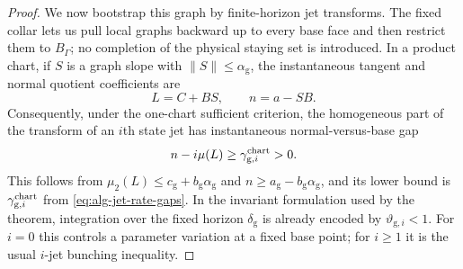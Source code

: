 \documentclass[11pt]{amsart}
\numberwithin{equation}{section}
\theoremstyle{definition}
\theoremstyle{remark}
\begin{document}
\begin{proof}
We now bootstrap this graph by finite-horizon jet transforms.  The fixed
collar lets us pull local graphs backward up to every base face and then
restrict them to $B_\Gamma$; no completion of the physical staying set is
introduced.  In a product chart, if $S$ is a graph slope with
$\|S\|\le\alpha_{\mathrm g}$, the instantaneous tangent and normal
quotient coefficients are
\begin{equation}\label{eq:corridor-tangent-normal-rates}
 L=C+BS,\qquad n=a-SB.
\end{equation}
Consequently, under the one-chart sufficient criterion, the homogeneous
part of the transform of an $i$th state jet has instantaneous
normal-versus-base gap
\begin{equation}\label{eq:corridor-jet-contraction-rate}
 n-i\mu(L)\ge\gamma^{\rm chart}_{\mathrm g,i}>0.
\end{equation}
This follows from
$\mu_2(L)\le c_{\mathrm g}+b_{\mathrm g}\alpha_{\mathrm g}$ and
$n\ge a_{\mathrm g}-b_{\mathrm g}\alpha_{\mathrm g}$, and its lower
bound is $\gamma^{\rm chart}_{\mathrm g,i}$ from
\eqref{eq:alg-jet-rate-gaps}.
In the invariant formulation used by the theorem, integration over the
fixed horizon $\delta_{\mathrm g}$ is already encoded by
$\vartheta_{\mathrm g,i}<1$.  For $i=0$ this controls a parameter
variation at a fixed base point; for $i\ge1$ it is the usual $i$-jet
bunching inequality.


\end{proof}
\end{document}
